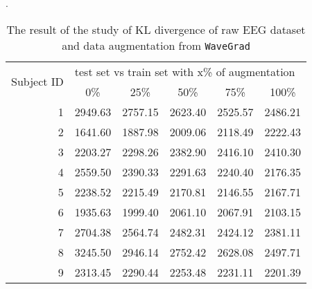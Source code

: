 \begin{table}[ht]
    \caption[The result of KL divergence]{\label{tab:KL1}The result of the study of KL divergence of raw EEG dataset and data augmentation from \texttt{WaveGrad}}.
    \begin{indented}
    \item[]\begin{tabular}{rccccc}
    \hline
    \multirow{2}{*}{Subject ID} & \multicolumn{5}{l}{test set vs train set with x\% of augmentation} \\ \cline{2-6} 
                                & 0\%         & 25\%        & 50\%        & 75\%        & 100\%      \\ \hline
    1                           & 2949.63     & 2757.15     & 2623.40     & 2525.57     & 2486.21    \\
    2                           & 1641.60     & 1887.98     & 2009.06     & 2118.49     & 2222.43    \\
    3                           & 2203.27     & 2298.26     & 2382.90     & 2416.10     & 2410.30    \\
    4                           & 2559.50     & 2390.33     & 2291.63     & 2240.40     & 2176.35    \\
    5                           & 2238.52     & 2215.49     & 2170.81     & 2146.55     & 2167.71    \\
    6                           & 1935.63     & 1999.40     & 2061.10     & 2067.91     & 2103.15    \\
    7                           & 2704.38     & 2564.74     & 2482.31     & 2424.12     & 2381.11    \\
    8                           & 3245.50     & 2946.14     & 2752.42     & 2628.08     & 2497.71    \\
    9                           & 2313.45     & 2290.44     & 2253.48     & 2231.11     & 2201.39   
    \end{tabular}
    \end{indented}
\end{table}

